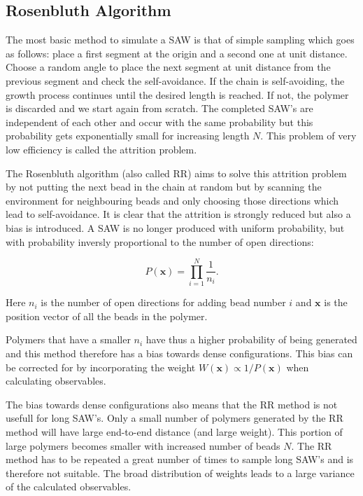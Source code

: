 \subsection*{Rosenbluth Algorithm}

The most basic method to simulate a SAW is that of simple sampling which goes as follows: place a first segment at the origin and a second one at unit distance. Choose a random angle to place the next segment at unit distance from the previous segment and check the self-avoidance. If the chain is self-avoiding, the growth process continues until the desired length is reached. If not, the polymer is discarded and we start again from scratch. The completed SAW's are independent of each other and occur with the same probability but this probability gets exponentially small for increasing length $N$. This problem of very low efficiency is called the attrition problem.

The Rosenbluth algorithm (also called RR) aims to solve this attrition problem by not putting the next bead in the chain at random but by scanning the environment for neighbouring beads and only choosing those directions which lead to self-avoidance. It is clear that the attrition is strongly reduced but also a bias is introduced. A SAW is no longer produced with uniform probability, but with probability inversly proportional to the number of open directions:

\begin{equation} \label{eq:prob_RR}
	P\left(\mathbf{x}\right) = \prod_{i=1}^{N} \frac{1}{n_i} .
\end{equation}

Here $n_i$ is the number of open directions for adding bead number $i$ and $\mathbf{x}$ is the position vector of all the beads in the polymer.

Polymers that have a smaller $n_i$ have thus a higher probability of being generated and this method therefore has a bias towards dense configurations. This bias can be corrected for by incorporating the weight $W\left( \mathbf{x} \right) \propto 1/ P\left( \mathbf{x} \right)$ when calculating observables.

The bias towards dense configurations also means that the RR method is not usefull for long SAW's. Only a small number of polymers generated by the RR method will have large end-to-end distance (and large weight). This portion of large polymers becomes smaller with increased number of beads $N$. The RR method has to be repeated a great number of times to sample long SAW's and is therefore not suitable. The broad distribution of weights leads to a large variance of the calculated observables.

